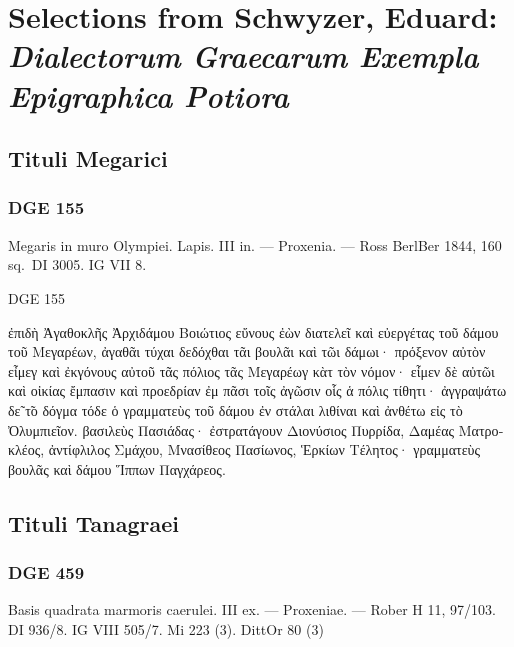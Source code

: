 \chapter{Selections from Schwyzer, Eduard: \textit{Dialectorum Graecarum Exempla Epigraphica
Potiora}}

\section{Tituli Megarici}
\subsection{DGE 155}
Megaris in muro Olympiei. Lapis. III in. — Proxenia. — Ross BerlBer 1844,
160 sq.\ DI 3005. IG VII 8.

\begin{versi}{DGE 155}
  \begin{greek}
    ἐπιδὴ Ἀγαθοκλῆς Ἀρχιδάμου {\verso[1]} Βοιώτιος εὔνους ἐὼν διατελεῖ
    {\verso} καὶ εὐεργέτας τοῦ δάμου τοῦ {\verso} Μεγαρέων, ἀγαθᾶι τύχαι
    δεδόχθαι τᾶι βουλᾶι καὶ τῶι δάμωι· {\verso} πρόξενον αὐτὸν εἶμεγ καὶ
    ἐκ{\verso}γόνους αὐτοῦ τᾶς πόλιος τᾶς {\verso} Μεγαρέωγ κὰτ τὸν νόμον·
    εἶμεν {\verso} δὲ αὐτῶι καὶ οἰκίας ἔμπασιν καὶ προεδρίαν ἐμ πᾶσι τοῖς
    ἀγῶ{\verso}σιν οἷς ἁ πόλις τίθητι· ἀγγραψά{\verso}τω δε̃ τ̃ο δόγμα τόδε
    ὁ γραμματεὺς τοῦ δάμου ἐν στάλαι λιθί{\verso}ναι καὶ ἀνθέτω εἰς τὸ
    Ὀλυμπιεῖον. βασιλεὺς Πασιάδας· ἐστρατά{\verso}γουν Διονύσιος Πυρρίδα,
    Δαμέ{\verso}ας Ματροκλέος, ἀντίφλιλος Σμά{\verso}χου, Μνασίθεος
    Πασίωνος, Ἑρκίων {\verso} Τέλητος· γραμματεὺς βουλᾶς καὶ δάμου Ἵππων
    Παγχάρεος.
  \end{greek}
\end{versi}


\section{Tituli Tanagraei}
\subsection{DGE 459}
Basis quadrata marmoris caerulei. III ex. — Proxeniae. — Rober H 11,
97/103. DI 936/8. IG VIII 505/7. Mi 223 (3). DittOr 80 (3)

